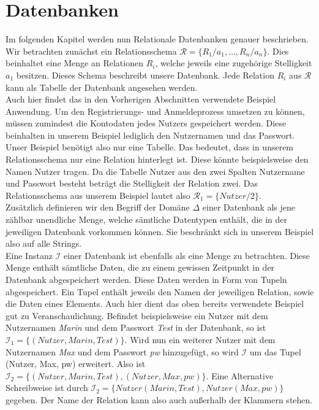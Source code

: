 \section{Datenbanken}\label{Datenbanken}
Im folgenden Kapitel werden nun Relationale Datenbanken genauer beschrieben. Wir betrachten zunächst ein Relationsschema  $\mathcal{R} = \{R_1/a_1,…,R_n/a_n\}$. Dies beinhaltet eine Menge an Relationen $R_i$, welche jeweils eine zugehörige Stelligkeit $a_1$ besitzen. Dieses Schema beschreibt unsere Datenbank. Jede Relation $R_i$ aus  $\mathcal{R}$ kann als Tabelle der Datenbank angesehen werden. \\
Auch hier findet das in den Vorherigen Abschnitten verwendete Beispiel Anwendung. Um den Registrierungs- und Anmeldeprozess umsetzen zu können, müssen zumindest die Kontodaten jedes Nutzers gespeichert werden. Diese beinhalten in unserem Beispiel lediglich den Nutzernamen und das Passwort. Unser Beispiel benötigt also nur eine Tabelle. Das bedeutet, dass in unserem Relationsschema nur eine Relation hinterlegt ist. Diese könnte beispielsweise den Namen Nutzer tragen. Da die Tabelle Nutzer aus den zwei Spalten Nutzername und Passwort besteht beträgt die Stelligkeit der Relation zwei. Das Relationsschema aus unserem Beispiel lautet also $\mathcal{R}_1=\{Nutzer/2\}$. \\
Zusätzlich definieren wir den Begriff der Domäne ${\Delta}$ einer Datenbank als jene zählbar unendliche Menge, welche sämtliche Datentypen enthält, die in der jeweiligen Datenbank vorkommen können. Sie beschränkt sich in unserem Beispiel also auf alle Strings. \\
Eine Instanz $\mathcal{I}$ einer Datenbank ist ebenfalls als eine Menge zu betrachten. Diese Menge enthält sämtliche Daten, die zu einem gewissen Zeitpunkt in der Datenbank abgespeichert werden. Diese Daten werden in Form von Tupeln abgespeichert. Ein Tupel enthält jeweils den Namen der jeweiligen Relation, sowie die Daten eines Elements. Auch hier dient das oben bereits verwendete Beispiel gut zu Veranschaulichung. Befindet beispielsweise ein Nutzer mit dem Nutzernamen \textit{Marin} und dem Passwort \textit{Test} in der Datenbank, so ist $\mathcal{I}_1 = \{(Nutzer, Marin, Test)\}$. Wird nun ein weiterer Nutzer mit dem Nutzernamen \textit{Max} und dem Passwort \textit{pw} hinzugefügt, so wird $\mathcal{I}$ um das Tupel (Nutzer, Max, pw) erweitert. Also ist $\mathcal{I}_2 =\{(Nutzer, Marin, Test), (Nutzer, Max, pw)\}$. Eine Alternative Schreibweise ist durch $\mathcal{I}_2 = \{Nutzer(Marin, Test), Nutzer(Max, pw)\}$ gegeben. Der Name der Relation kann also auch außerhalb der Klammern stehen.\\
